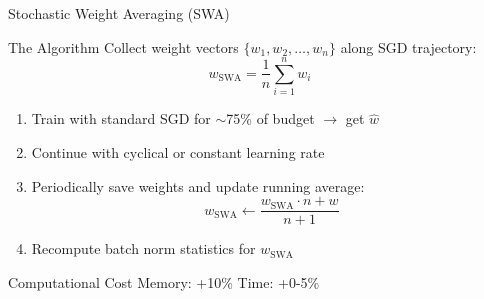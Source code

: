 \documentclass{beamer}
\begin{document}
\begin{frame}{Stochastic Weight Averaging (SWA)}

\begin{block}{The Algorithm}
Collect weight vectors $\{w_1, w_2, \ldots, w_n\}$ along SGD trajectory:
\begin{equation*}
w_{\text{SWA}} = \frac{1}{n} \sum_{i=1}^{n} w_i
\end{equation*}
\end{block}

\begin{enumerate}
    \item Train with standard SGD for $\sim$75\% of budget $\rightarrow$ get $\hat{w}$
    \item Continue with cyclical or constant learning rate
    \item Periodically save weights and update running average:
    \begin{equation*}
    w_{\text{SWA}} \leftarrow \frac{w_{\text{SWA}} \cdot n + w}{n + 1}
    \end{equation*}
    \item Recompute batch norm statistics for $w_{\text{SWA}}$
\end{enumerate}

\vspace{0.2cm}

\begin{block}{Computational Cost}
Memory: +10\% \quad Time: +0-5\%
\end{block}

\end{frame}
\end{document}
